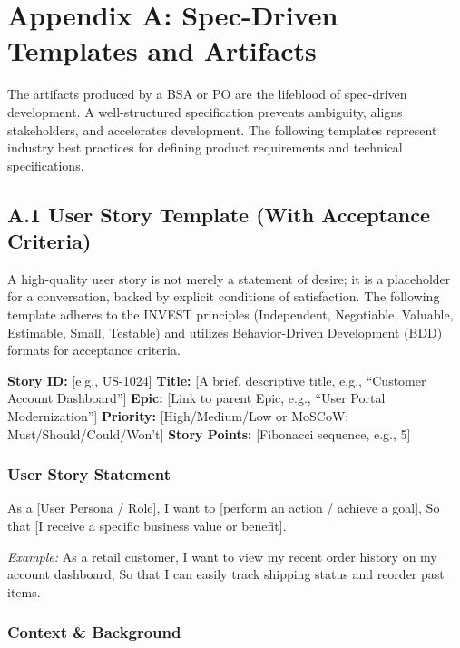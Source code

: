 \section{Appendix A: Spec-Driven Templates and
Artifacts}\label{appendix-a-spec-driven-templates-and-artifacts}

The artifacts produced by a BSA or PO are the lifeblood of spec-driven
development. A well-structured specification prevents ambiguity, aligns
stakeholders, and accelerates development. The following templates
represent industry best practices for defining product requirements and
technical specifications.

\subsection{A.1 User Story Template (With Acceptance
Criteria)}\label{a.1-user-story-template-with-acceptance-criteria}

A high-quality user story is not merely a statement of desire; it is a
placeholder for a conversation, backed by explicit conditions of
satisfaction. The following template adheres to the INVEST principles
(Independent, Negotiable, Valuable, Estimable, Small, Testable) and
utilizes Behavior-Driven Development (BDD) formats for acceptance
criteria.

\textbf{Story ID:} {[}e.g., US-1024{]} \textbf{Title:} {[}A brief,
descriptive title, e.g., ``Customer Account Dashboard''{]}
\textbf{Epic:} {[}Link to parent Epic, e.g., ``User Portal
Modernization''{]} \textbf{Priority:} {[}High/Medium/Low or MoSCoW:
Must/Should/Could/Won't{]} \textbf{Story Points:} {[}Fibonacci sequence,
e.g., 5{]}

\subsubsection{User Story Statement}\label{user-story-statement}

As a {[}User Persona / Role{]}, I want to {[}perform an action / achieve
a goal{]}, So that {[}I receive a specific business value or benefit{]}.

\emph{Example:} As a retail customer, I want to view my recent order
history on my account dashboard, So that I can easily track shipping
status and reorder past items.

\subsubsection{Context \& Background}\label{context-background}

